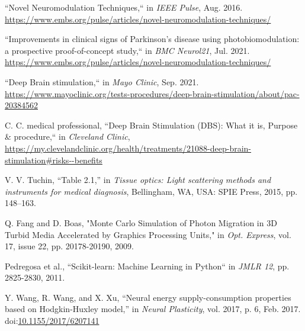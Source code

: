 \documentclass[journal,twoside,web]{ieeecolor}
\begin{document}
\begin{thebibliography}{00}

 ``Novel Neuromodulation Techniques,`` in \emph{IEEE Pulse}, Aug. 2016. 
\url{https://www.embs.org/pulse/articles/novel-neuromodulation-techniques/} 

 ``Improvements in clinical signs of Parkinson's disease using photobiomodulation: a prospective proof-of-concept study,`` in \emph{BMC Neurol21}, Jul. 2021. 
\url{https://www.embs.org/pulse/articles/novel-neuromodulation-techniques/} 

 ``Deep Brain stimulation,`` in \emph{Mayo Clinic}, Sep. 2021. 
\url{https://www.mayoclinic.org/tests-procedures/deep-brain-stimulation/about/pac-20384562}

 C. C. medical professional, ``Deep Brain Stimulation (DBS): What it is, Purpose \& procedure,`` in \emph{Cleveland Clinic}, 
\url{https://my.clevelandclinic.org/health/treatments/21088-deep-brain-stimulation\#risks--benefits}

 V. V. Tuchin, “Table 2.1,” in \emph{Tissue optics: Light scattering methods and instruments for medical diagnosis}, 
Bellingham, WA, USA: SPIE Press, 2015, pp. 148–163. 

 Q. Fang and D. Boas, "Monte Carlo Simulation of Photon Migration in 3D Turbid Media Accelerated by Graphics Processing Units," in \emph{Opt. Express}, 
vol. 17, issue 22, pp. 20178-20190, 2009.

 Pedregosa et al., ``Scikit-learn: Machine Learning in Python`` in \emph{JMLR 12}, pp. 2825-2830, 2011.

 Y. Wang, R. Wang, and X. Xu, “Neural energy supply-consumption properties based on Hodgkin-Huxley model,” in \emph{Neural Plasticity}, 
vol. 2017, p. 6, Feb. 2017. doi:\url{10.1155/2017/6207141} 

\end{thebibliography}

\appendices
\end{document}
